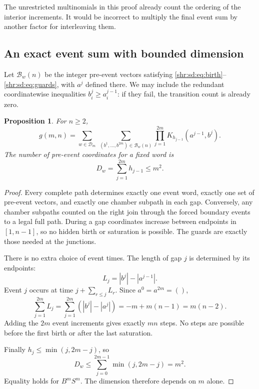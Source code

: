 \documentclass[11pt,letterpaper]{article}
\numberwithin{equation}{section}
\newtheorem{proposition}[theorem]{Proposition}
\theoremstyle{definition}
\newcommand{\1}{\mathbf 1}
\begin{document}
The unrestricted multinomials in this proof already count the ordering of the interior increments. It would be incorrect to multiply the final event sum by another factor for interleaving them.

\subsection{An exact event sum with bounded dimension}
Let $\mathcal B_w(n)$ be the integer pre-event vectors satisfying \eqref{shr:sd:eq:birth}--\eqref{shr:sd:eq:guards}, with $a^j$ defined there. We may include the redundant coordinatewise inequalities $b^j_i\ge a^{j-1}_i$: if they fail, the transition count is already zero.

\begin{proposition}\label{shr:sd:prop:events}
For $n\ge2$,
\begin{equation}\label{shr:sd:eq:eventsum}
 g(m,n)=\sum_{w\in\mathcal D_m}\ \sum_{(b^1,\ldots,b^{2m})\in\mathcal B_w(n)}
       \prod_{j=1}^{2m}K_{h_{j-1}}(a^{j-1},b^j).
\end{equation}
The number of pre-event coordinates for a fixed word is
\begin{equation}\label{shr:sd:eq:dimension}
 D_w=\sum_{j=1}^{2m}h_{j-1}\le m^2.
\end{equation}
\end{proposition}
\begin{proof}
Every complete path determines exactly one event word, exactly one set of pre-event vectors, and exactly one chamber subpath in each gap. Conversely, any chamber subpaths counted on the right join through the forced boundary events to a legal full path. During a gap coordinates increase between endpoints in $[1,n-1]$, so no hidden birth or saturation is possible. The guards are exactly those needed at the junctions.

There is no extra choice of event times. The length of gap $j$ is determined by its endpoints:
\[
 L_j=|b^j|-|a^{j-1}|.
\]
Event $j$ occurs at time $j+\sum_{r\le j}L_r$. Since $a^0=a^{2m}=()$,
\[
 \sum_{j=1}^{2m}L_j
 =\sum_{j=1}^{2m}(|b^j|-|a^j|)
 =-m+m(n-1)=m(n-2).
\]
Adding the $2m$ event increments gives exactly $mn$ steps. No steps are possible before the first birth or after the last saturation.

Finally $h_j\le\min(j,2m-j)$, so
\[
 D_w\le\sum_{j=0}^{2m-1}\min(j,2m-j)=m^2.
\]
Equality holds for $B^mS^m$. The dimension therefore depends on $m$ alone.
\end{proof}
\end{document}
